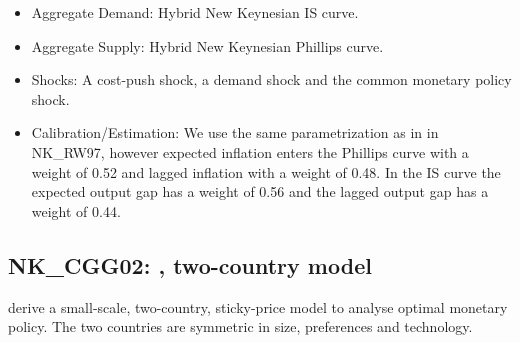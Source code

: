 \documentclass[11pt,a4paper]{article}
\begin{document}
	\begin{itemize}
		\item Aggregate Demand: Hybrid New Keynesian IS curve.
		\item Aggregate Supply: Hybrid New Keynesian Phillips curve.
		\item Shocks: A cost-push shock, a demand shock and the common monetary policy shock.
		\item Calibration/Estimation: We use the same parametrization as in in NK\_RW97, however %
		expected inflation enters the Phillips curve with a weight of 0.52 and lagged inflation with a weight of 0.48. In the IS curve the expected output gap has a weight of 0.56 and the lagged output gap has a weight of 0.44. %
	\end{itemize}
	
	
	\subsection{NK\_CGG02: \texorpdfstring{\cite{ClaridaGaliGertler2002}}{Clarida et al. (2002)}, two-country model}
	
	\label{NKCGG02}
	
	\cite{ClaridaGaliGertler2002} derive a small-scale, two-country, sticky-price model to analyse optimal monetary policy. The two countries are symmetric in size, preferences and technology.
	
\end{document}
